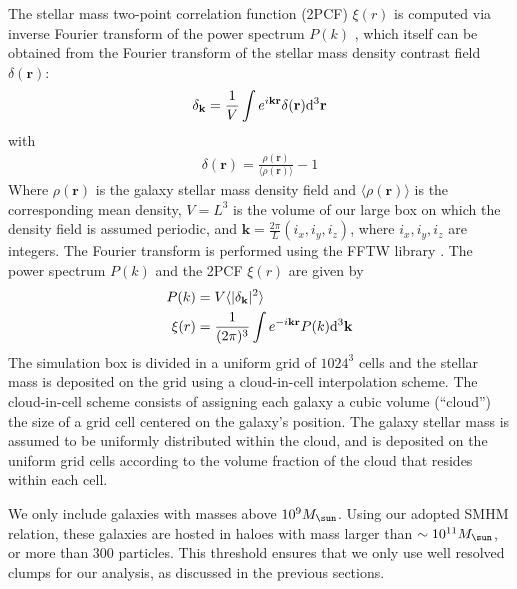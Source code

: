 The  stellar mass  two-point correlation  function (2PCF)  $\xi(r)$ is
computed via  inverse Fourier transform  of the power  spectrum $P(k)$
\citep[e.g.][]{Mo},  which itself  can  be obtained  from the  Fourier
transform    of   the    stellar   mass    density   contrast    field
$\delta(\mathbf{r})$:
%
\begin{align}
  \delta_\mathbf{k} = \frac{1}{V}\int e^{i\mathbf{kr}} \delta(\mathbf{r}) \mathrm{d} ^3 \mathbf{r}
\end{align}
%
with
%
\begin{align}
	\delta(\mathbf{r}) = \frac{\rho(\mathbf{r})}{\langle \rho(\mathbf{r}) \rangle } - 1
\end{align}
%
Where $\rho(\mathbf{r})$ is the galaxy  stellar mass density field and
$\langle \rho(\mathbf{r}) \rangle$ is  the corresponding mean density,
$V = L^3$ is the volume of our large box on which the density field is
assumed  periodic,  and  $\mathbf{k}=\frac{2\pi}{L}(i_x,  i_y,  i_z)$,
where  $i_x,  i_y,  i_z$  are  integers.   The  Fourier  transform  is
performed using  the FFTW library \citep{FFTW05}.   The power spectrum
$P(k)$ and the 2PCF $\xi(r)$ are given by
%
\begin{align}
  P(k)    &= V \langle |\delta_\mathbf{k}|^2 \rangle \\
  \xi(r)  &= \frac{1}{(2\pi)^3} \int e^{-i\mathbf{kr}} P(k) \mathrm{d}^3 \mathbf{k} 
\end{align}
The simulation box is divided in  a uniform grid of $1024^3$ cells and
the  stellar mass  is  deposited  on the  grid  using a  cloud-in-cell
interpolation scheme.  The cloud-in-cell scheme consists  of assigning
each  galaxy a  cubic  volume  (``cloud'') the  size  of  a grid  cell
centered on the galaxy's position.  The galaxy stellar mass is assumed
to be uniformly distributed within the  cloud, and is deposited on the
uniform grid cells according to the  volume fraction of the cloud that
resides within each cell.

We only  include galaxies with  masses above $10^9 \msol$.   Using our
adopted SMHM relation,  these galaxies are hosted in  haloes with mass
larger than  $\sim 10^{11} \msol$,  or more than 300  particles.  This
threshold  ensures that  we  only  use well  resolved  clumps for  our
analysis, as discussed in the previous sections.

